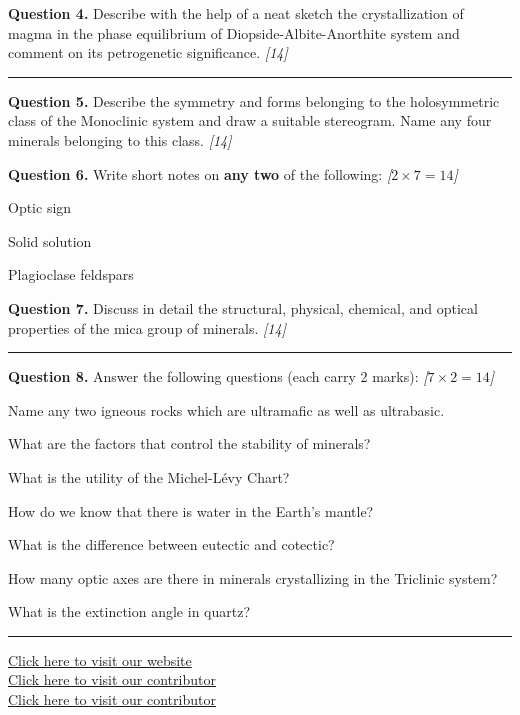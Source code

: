 \documentclass[11pt,a4paper]{article}
\newcommand{\pts}[1]{\hfill   \textit{[#1]}}
\begin{document}
\medskip


\noindent   \textbf{Question 4.} Describe with the help of a neat sketch the crystallization of magma in the phase equilibrium of Diopside-Albite-Anorthite system and comment on its petrogenetic significance. \pts{14}

\bigskip


\rule{\linewidth}{0.4pt}\smallskip




\noindent   \textbf{Question 5.} Describe the symmetry and forms belonging to the holosymmetric class of the Monoclinic system and draw a suitable stereogram. Name any four minerals belonging to this class. \pts{14}

\medskip


\noindent   \textbf{Question 6.} Write short notes on   \textbf{any two} of the following: \pts{$2  \times 7 = 14$}

\begin{parts}
  \item Optic sign
  \item Solid solution
  \item Plagioclase feldspars
\end{parts}

\medskip


\noindent   \textbf{Question 7.} Discuss in detail the structural, physical, chemical, and optical properties of the mica group of minerals. \pts{14}

\bigskip


\rule{\linewidth}{0.4pt}\smallskip




\noindent   \textbf{Question 8.} Answer the following questions (each carry 2 marks): \pts{$7  \times 2 = 14$}

\begin{romanparts}
  \item Name any two igneous rocks which are ultramafic as well as ultrabasic.
  \item What are the factors that control the stability of minerals?
  \item What is the utility of the Michel-Lévy Chart?
  \item How do we know that there is water in the Earth's mantle?
  \item What is the difference between eutectic and cotectic?
  \item How many optic axes are there in minerals crystallizing in the Triclinic system?
  \item What is the extinction angle in quartz?
\end{romanparts}

\vfill\rule{\linewidth}{0.4pt}

\begin{center}\small
\href{https://bhu-exam.vercel.app/}{Click here to visit our website}\\[4pt]
\href{https://me-aryan.vercel.app/}{Click here to visit our contributor}\\[4pt]
\href{https://quashan-me.vercel.app/}{Click here to visit our contributor}
\end{center}
\end{document}
